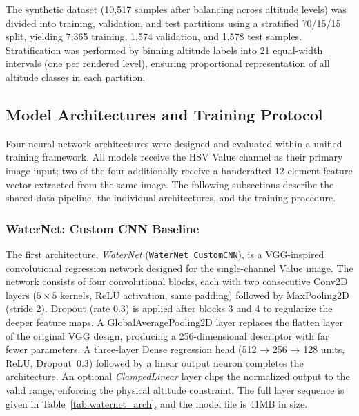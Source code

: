 The synthetic dataset (10{,}517 samples after balancing across altitude levels) was divided into training, validation, and test partitions using a stratified 70/15/15 split, yielding 7{,}365 training, 1{,}574 validation, and 1{,}578 test samples. Stratification was performed by binning altitude labels into 21 equal-width intervals (one per rendered level), ensuring proportional representation of all altitude classes in each
partition.

\subsection{Model Architectures and Training Protocol}
\label{subsec:models}

Four neural network architectures were designed and evaluated within a unified training framework. All models receive the HSV Value channel as their primary image input; two of the four additionally receive a handcrafted 12-element feature vector extracted from the same image. The following subsections describe the shared data pipeline, the individual architectures, and the training procedure.



\subsubsection{WaterNet: Custom CNN Baseline}
\label{subsubsec:waternet}

The first architecture, \textit{WaterNet} (\texttt{WaterNet\_CustomCNN}), is a VGG-inspired ~\cite{vgg16} convolutional regression network designed for the single-channel Value image. The network consists of four convolutional blocks, each with two consecutive Conv2D layers ($5\times5$ kernels, ReLU activation, same padding) followed by MaxPooling2D (stride 2). Dropout (rate 0.3) is applied after blocks 3 and 4 to regularize the deeper feature maps. A GlobalAveragePooling2D layer replaces the flatten layer of the original VGG design, producing a 256-dimensional descriptor with far fewer parameters. A three-layer Dense regression head (512 → 256 → 128 units, ReLU, Dropout~0.3) followed by a linear output neuron completes the architecture. An optional \textit{ClampedLinear} layer clips the normalized output to the valid range, enforcing the physical altitude constraint. The full layer sequence is given in Table~\ref{tab:waternet_arch}, and the model file is 41MB in size.

